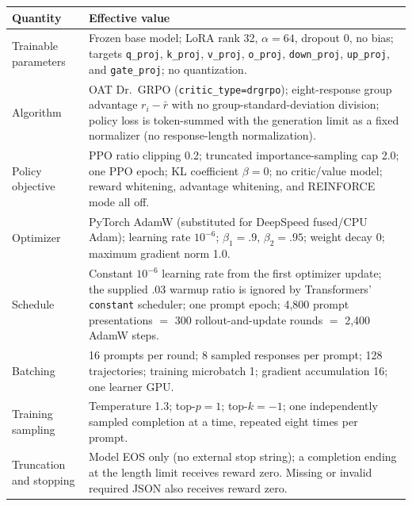 \begin{center}
\begin{minipage}{\linewidth}
\centering
{}
\label{tab:exp3-oat-common}
\scriptsize
\setlength{\tabcolsep}{3pt}
\begin{tabular}{p{.29\linewidth}p{.66\linewidth}}
\toprule
\textbf{Quantity} & \textbf{Effective value} \\
\midrule
Trainable parameters & Frozen base model; LoRA rank 32, $\alpha=64$, dropout 0,
no bias; targets \texttt{q\_proj}, \texttt{k\_proj}, \texttt{v\_proj},
\texttt{o\_proj}, \texttt{down\_proj}, \texttt{up\_proj}, and
\texttt{gate\_proj}; no quantization. \\
Algorithm & OAT Dr.~GRPO (\texttt{critic\_type=drgrpo}); eight-response group
advantage $r_i-\bar r$ with no group-standard-deviation division; policy loss is
token-summed with the generation limit as a fixed normalizer (no response-length
normalization). \\
Policy objective & PPO ratio clipping 0.2; truncated importance-sampling cap 2.0;
one PPO epoch; KL coefficient $\beta=0$; no critic/value model; reward whitening,
advantage whitening, and REINFORCE mode all off. \\
Optimizer & PyTorch AdamW \citep{loshchilov2019decoupled} (substituted for
DeepSpeed fused/CPU Adam); learning rate
$10^{-6}$; $\beta_1=.9$, $\beta_2=.95$; weight decay 0; maximum gradient norm 1.0. \\
Schedule & Constant $10^{-6}$ learning rate from the first optimizer update; the
supplied .03 warmup ratio is ignored by Transformers' \texttt{constant} scheduler;
one prompt epoch; 4,800 prompt presentations $=$ 300 rollout-and-update rounds
$=$ 2,400 AdamW steps. \\
Batching & 16 prompts per round; 8 sampled responses per prompt; 128 trajectories;
training microbatch 1; gradient accumulation 16; one learner GPU. \\
Training sampling & Temperature 1.3; top-$p=1$; top-$k=-1$; one independently
sampled completion at a time, repeated eight times per prompt. \\
Truncation and stopping & Model EOS only (no external stop string); a completion
ending at the length limit receives reward zero.  Missing or invalid required JSON
also receives reward zero. \\

\end{tabular}
\end{minipage}
\end{center}
